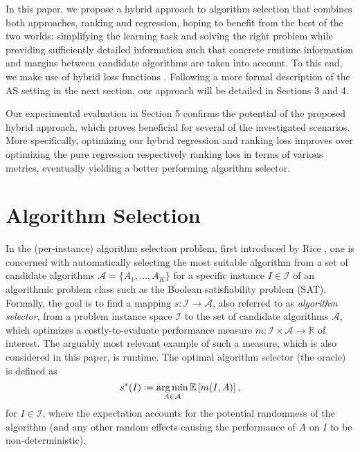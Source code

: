 \documentclass[runningheads]{llncs}
\DeclareMathOperator*{\argmin}{arg\,min}
\newcommand*{\defeq}{\mathrel{\vcenter{\baselineskip0.5ex \lineskiplimit0pt
			\hbox{\footnotesize.}\hbox{\footnotesize.}}}%
	=}
\begin{document}
In this paper, we propose a hybrid approach to algorithm selection that combines both approaches, ranking and regression, hoping to benefit from the best of the two worlds: simplifying the learning task and solving the right problem while providing sufficiently detailed information such that concrete runtime information and margins between candidate algorithms are taken into account. To this end, we make use of hybrid loss functions \cite{combined_ranking_and_regression_sculley10}. Following a more formal description of the AS setting in the next section, our approach will be detailed in Sections 3 and 4. 

Our experimental evaluation in Section 5 confirms the potential of the proposed hybrid approach, which proves beneficial for several of the investigated scenarios. More specifically, optimizing our hybrid regression and ranking loss improves over optimizing the pure regression respectively ranking loss in terms of various metrics, eventually yielding a better performing algorithm selector.

\section{Algorithm Selection}
\label{sec:problem_definition}
In the (per-instance) algorithm selection problem, first introduced by Rice \cite{rice_algorithm_1976}, one is concerned with automatically selecting the most suitable algorithm from a set of candidate algorithms $\mathcal{A}  = \{A_1,\dots,A_K\}$ for a specific instance $I \in \mathcal{I}$ of an algorithmic problem class such as the Boolean satisfiability problem (SAT). Formally, the goal is to find a mapping $s \colon \mathcal{I} \to \mathcal{A}$, also referred to as \textit{algorithm selector}, from a problem instance space $\mathcal{I}$ to the set of candidate algorithms $\mathcal{A}$, which optimizes a costly-to-evaluate performance measure $m \colon \mathcal{I} \times \mathcal{A} \to \mathbb{R}$ of interest. The arguably most relevant example of such a measure, which is also considered in this paper, is runtime. The optimal algorithm selector (the oracle) is defined as
\begin{equation}
    s^{*}(I) \defeq \argmin_{A \in \mathcal{A}} \mathbb{E} \, [m(I,A)] \, ,
\end{equation} 
for $I \in \mathcal{I}$, where the expectation accounts for the potential randomness of the algorithm (and any other random effects causing the performance of $A$ on $I$ to be non-deterministic).
\end{document}
